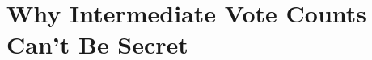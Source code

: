 \documentclass[finalcopy,nolof,nolot]{srpaper}
\begin{document}
\listoftodos


\appendix
\chapter{Why Intermediate Vote Counts Can't Be
Secret}\label{Appendix:SecretProof}

\end{document}
